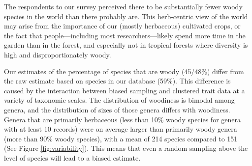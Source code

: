 The respondents to our survey perceived there to be substantially
fewer woody species in the world than there probably are.  This
herb-centric view of the world may arise from the importance of our
(mostly herbaceous) cultivated crops, or the fact that people---including 
most researchers---likely spend more time in the garden than in
the forest, and especially not in tropical forests where diversity is high and disproportionately woody.

Our estimates of the percentage of species that are woody (45/48\%)
differ from the raw estimate based on species in our database (59\%).
This difference is caused by the interaction between biased sampling
and clustered trait data at a variety of taxonomic scales.
The distribution of woodiness is bimodal among genera, and the
distribution of sizes of those genera differs with woodiness.  Genera
that are primarily herbaceous (less than 10\% woody species for genera
with at least 10 records) were on average larger than primarily woody
genera (more than 90\% woody species), with a mean of 214 species
compared to 151 (See Figure \ref{fig:variability}).
This means that even a random sampling above the level of species will
lead to a biased estimate.

